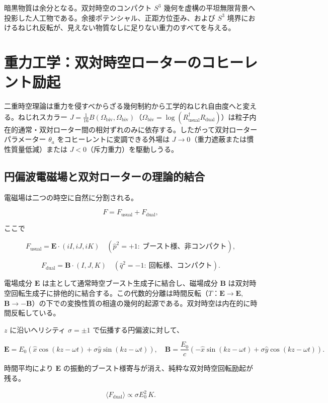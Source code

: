 \documentclass[dvipdfmx,a4paper]{article}
\begin{document}
暗黒物質は余分となる。双対時空のコンパクト $S^3$ 幾何を虚構の平坦無限背景へ投影した人工物である。余接ポテンシャル、正距方位歪み、および $S^3$ 境界におけるねじれ反転が、見えない物質なしに足りない重力のすべてを与える。

\section{重力工学：双対時空ローターのコヒーレント励起}
\label{sec:gravitycontrol}

二重時空理論は重力を侵すべからざる幾何制約から工学的ねじれ自由度へと変える。ねじれスカラー $J = \frac{1}{16} B(\Omega_{\text{biv}}, \Omega_{\text{biv}})$（$\Omega_{\text{biv}} = \log(R_{\text{usual}}^\dagger R_{\text{dual}})$）は粒子内在的通常・双対ローター間の相対ずれのみに依存する。したがって双対ローターパラメーター $\theta_a$ をコヒーレントに変調できる外場は $J \to 0$（重力遮蔽または慣性質量低減）または $J < 0$（斥力重力）を駆動しうる。

\subsection{円偏波電磁場と双対ローターの理論的結合}

電磁場は二つの時空に自然に分割される。

\[
F = F_{\text{usual}} + F_{\text{dual}},
\]

ここで

\[
F_{\text{usual}} = \mathbf{E} \cdot (iI, iJ, iK) \quad (\hat{p}^2 = +1:\ \text{ブースト様、非コンパクト}),
\]

\[
F_{\text{dual}} = \mathbf{B} \cdot (I, J, K) \quad (\hat{q}^2 = -1:\ \text{回転様、コンパクト}).
\]

電場成分 $\mathbf{E}$ は主として通常時空ブースト生成子に結合し、磁場成分 $\mathbf{B}$ は双対時空回転生成子に排他的に結合する。この代数的分離は時間反転（$T$：$\mathbf{E} \to \mathbf{E}$, $\mathbf{B} \to -\mathbf{B}$）の下での変換性質の相違の幾何的起源である。双対時空は内在的に時間反転している。

$z$ に沿いヘリシティ $\sigma = \pm 1$ で伝播する円偏波に対して、

\[
\mathbf{E} = E_0 (\hat{x} \cos(kz - \omega t) + \sigma \hat{y} \sin(kz - \omega t)), \quad \mathbf{B} = \frac{E_0}{c} (-\hat{x} \sin(kz - \omega t) + \sigma \hat{y} \cos(kz - \omega t)).
\]

時間平均により $\mathbf{E}$ の振動的ブースト様寄与が消え、純粋な双対時空回転励起が残る。

\[
\langle F_{\text{dual}} \rangle \propto \sigma E_0^2 \, K.
\]
\end{document}
